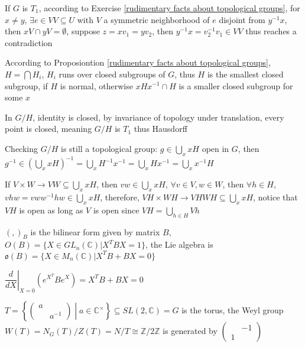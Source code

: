 \documentclass[main]{subfiles}
\begin{document}
\begin{solution}
If $G$ is $T_1$, according to Exercise \ref{rudimentary facts about topological groups}, for $x\neq y$, $\exists e\in VV\subseteq U$ with $V$ a symmetric neighborhood of $e$ disjoint from $y^{-1}x$, then $xV\cap yV=\emptyset$, suppose $z=xv_1=yv_2$, then $y^{-1}x=v_2^{-1}v_1\in VV$ thus reaches a contradiction \par
According to Proposiontion \ref{rudimentary facts about topological groups}, $H=\bigcap H_i$, $H_i$ runs over closed subgroups of $G$, thus $H$ is the smallest closed subgroup, if $H$ is normal, otherwise $xHx^{-1}\cap H$ is a smaller closed subgroup for some $x$ \par
In $G/H$, identity is closed, by invariance of topology under translation, every point is closed, meaning $G/H$ is $T_1$ thus Hausdorff \par
Checking $G/H$ is still a topological group: $g\in \bigcup_{x}xH$ open in $G$, then $g^{-1}\in \left(\bigcup_{x}xH\right)^{-1}=\bigcup_{x}H^{-1}x^{-1}=\bigcup_{x}Hx^{-1}=\bigcup_{x}x^{-1}H$ \par
If $V\times W\to VW\subseteq \bigcup_{x}xH$, then $vw\in\bigcup_{x}xH$, $\forall v\in V,w\in W$, then $\forall h\in H$, $vhw=vww^{-1}hw\in\bigcup_{x}xH$, therefore, $VH\times WH\to VHWH\subseteq\bigcup_{x}xH$, notice that $VH$ is open as long as $V$ is open since $VH=\bigcup_{h\in H}Vh$
\end{solution}

\begin{exercise}
$(,)_B$ is the bilinear form given by matrix $B$, $O(B)=\{X\in GL_n(\mathbb C)|X^TBX=1\}$, the Lie algebra is $\mathfrak o(B)=\{X\in M_n(\mathbb C)|X^TB+BX=0\}$
\end{exercise}

\begin{solution}
$\left.\dfrac{d}{dX}\right|_{X=0}(e^{X^T}Be^X)=X^TB+BX=0$
\end{solution}

\begin{exercise}
$T=\left\{\begin{pmatrix}
a &\\
&a^{-1}
\end{pmatrix}\middle|a\in\mathbb C^\times\right\}\subseteq SL(2,\mathbb C)=G$ is the torus, the Weyl group $W(T)=N_G(T)/Z(T)=N/T\cong \mathbb Z/2\mathbb Z$ is generated by $\begin{pmatrix}
&-1\\
1&
\end{pmatrix}$
\end{exercise}
\end{document}
